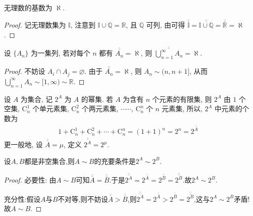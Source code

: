 \documentclass[../../main.tex]{subfiles}
\begin{document}
\begin{corollary}
无理数的基数为 $\aleph$.
\end{corollary}
\begin{proof}
记无理数集为 $\mathbb{I}$, 注意到 $\mathbb{I} \cup \mathbb{Q} = \mathbb{R}$, 且 $\mathbb{Q}$ 可列, 由可得 $\overline{\overline{\mathbb{I}}} = \overline{\overline{\mathbb{I} \cup \mathbb{Q}}} = \overline{\overline{\mathbb{R}}} = \aleph$. 
\end{proof}

\begin{theorem}
设 $\{A_n\}$ 为一集列, 若对每个 $n$ 都有 $\overline{\overline{A_n}} = \aleph$, 则 $\overline{\overline{\bigcup_{n = 1}^{\infty} A_n}} = \aleph$.
\end{theorem}
\begin{proof}
不妨设 $A_i \cap A_j = \varnothing$. 由于 $\overline{\overline{A_n}} = \aleph$, 则 $A_n \sim (n, n + 1]$, 从而 $\bigcup_{n = 1}^{\infty} A_n \sim [1, \infty) \sim \mathbb{R}$.
\end{proof}

\begin{definition}
设 $A$ 为集合, 记 $2^A$ 为 $A$ 的幂集. 若 $A$ 为含有 $n$ 个元素的有限集, 则 $2^A$ 由 $1$ 个空集, $\mathrm{C}_{n}^1$ 个单元素集, $\mathrm{C}_{n}^2$ 个两元素集, $\cdots\cdots$, $\mathrm{C}_{n}^n$ 个 $n$ 元素集, 所以, $2^A$ 中元素的个数为
\begin{align*}
1 + \mathrm{C}_{n}^1 + \mathrm{C}_{n}^2 + \cdots + \mathrm{C}_{n}^n = (1 + 1)^n = 2^n = 2^{\overline{\overline{A}}}
\end{align*}
更一般地, 设 $\overline{\overline{A}} = \mu$, 定义 $\overline{\overline{2^A}} = 2^{\mu}$.
\end{definition}

\begin{proposition}\label{proposition:两集合对等的充要条件是幂集也对等}
设$A,B$都是非空集合,则$A\sim B$的充要条件是$2^A\sim 2^B$.
\end{proposition}
\begin{proof}
必要性:
由$A\sim B$可知$\overline{\overline{A}}=\overline{\overline{B}}$.于是$\overline{\overline{2^A}}=2^{\overline{\overline{A}}}=2^{\overline{\overline{B}}}=\overline{\overline{2^B}}.$故$2^A\sim 2^B$.

充分性:假设$A$与$B$不对等,则不妨设$\overline{\overline{A}}>\overline{\overline{B}}$,则$\overline{\overline{2^A}}=2^{\overline{\overline{A}}}>2^{\overline{\overline{B}}}=\overline{\overline{2^B}}$,这与$2^A\sim 2^B$矛盾!故$A\sim B$.
\end{proof}
\end{document}

